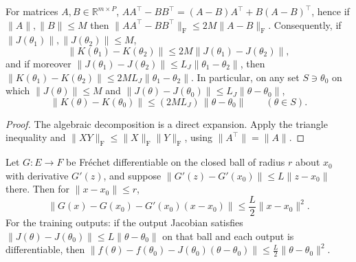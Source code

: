 \begin{theorem}\label{thm:ntkgf:kernelLipschitz}
  \leanok

For matrices $A,B\in\mathbb R^{m\times P}$, $AA^\top-BB^\top=(A-B)A^\top+B(A-B)^\top$, hence if $\|A\|,\|B\|\le M$ then
$\|AA^\top-BB^\top\|_{\mathrm F}\le2M\|A-B\|_{\mathrm F}$. Consequently, if $\|J(\theta_1)\|,\|J(\theta_2)\|\le M$,
\[
  \|K(\theta_1)-K(\theta_2)\|\le2M\|J(\theta_1)-J(\theta_2)\|,
\]
and if moreover $\|J(\theta_1)-J(\theta_2)\|\le L_J\|\theta_1-\theta_2\|$, then $\|K(\theta_1)-K(\theta_2)\|\le2ML_J\|\theta_1-\theta_2\|$.
In particular, on any set $S\ni\theta_0$ on which $\|J(\theta)\|\le M$ and $\|J(\theta)-J(\theta_0)\|\le L_J\|\theta-\theta_0\|$,
\[
  \|K(\theta)-K(\theta_0)\|\le(2ML_J)\,\|\theta-\theta_0\|\qquad(\theta\in S).
\]
\end{theorem}

\begin{proof}
  \leanok
The algebraic decomposition is a direct expansion. Apply the triangle inequality and $\|XY\|_{\mathrm F}\le\|X\|_{\mathrm F}\|Y\|_{\mathrm F}$, using $\|A^\top\|=\|A\|$.
\end{proof}

\begin{theorem}\label{thm:ntkgf:taylor}
  \leanok
Let $G:E\to F$ be Fr\'echet differentiable on the closed ball of radius $r$ about $x_0$ with derivative $G'(z)$, and suppose
$\|G'(z)-G'(x_0)\|\le L\|z-x_0\|$ there. Then for $\|x-x_0\|\le r$,
\[
  \|G(x)-G(x_0)-G'(x_0)(x-x_0)\|\le\frac L2\|x-x_0\|^2 .
\]
For the training outputs: if the output Jacobian satisfies $\|J(\theta)-J(\theta_0)\|\le L\|\theta-\theta_0\|$ on that ball and each output is differentiable, then
$\|f(\theta)-f(\theta_0)-J(\theta_0)(\theta-\theta_0)\|\le\frac L2\|\theta-\theta_0\|^2$.
\end{theorem}

